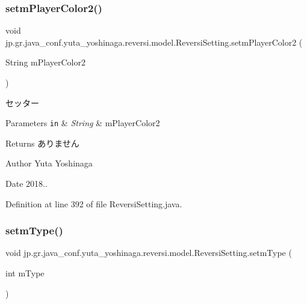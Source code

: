 \subsubsection{\texorpdfstring{setm\+Player\+Color2()}{setmPlayerColor2()}}
{\footnotesize\ttfamily void jp.\+gr.\+java\+\_\+conf.\+yuta\+\_\+yoshinaga.\+reversi.\+model.\+Reversi\+Setting.\+setm\+Player\+Color2 (\begin{DoxyParamCaption}\item[{String}]{m\+Player\+Color2 }\end{DoxyParamCaption})}



セッター 


\begin{DoxyParams}[1]{Parameters}
\mbox{\tt in}  & {\em String} & m\+Player\+Color2 \\
\hline
\end{DoxyParams}
\begin{DoxyReturn}{Returns}
ありません 
\end{DoxyReturn}
\begin{DoxyAuthor}{Author}
Yuta Yoshinaga 
\end{DoxyAuthor}
\begin{DoxyDate}{Date}
2018.. 
\end{DoxyDate}


Definition at line 392 of file Reversi\+Setting.\+java.

\mbox{\label{classjp_1_1gr_1_1java__conf_1_1yuta__yoshinaga_1_1reversi_1_1model_1_1_reversi_setting_a3c55d07908d395a2d0c23cfea9733804}} 
\subsubsection{\texorpdfstring{setm\+Type()}{setmType()}}
{\footnotesize\ttfamily void jp.\+gr.\+java\+\_\+conf.\+yuta\+\_\+yoshinaga.\+reversi.\+model.\+Reversi\+Setting.\+setm\+Type (\begin{DoxyParamCaption}\item[{int}]{m\+Type }\end{DoxyParamCaption})}



